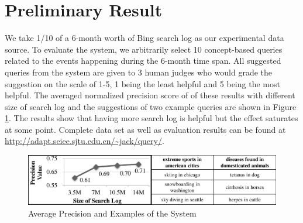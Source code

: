 \section{Preliminary Result}\label{sec:result}
We take 1/10 of a 6-month worth of Bing search log as our experimental
data source. To evaluate the system, we arbitrarily select 10
concept-based queries related to the events happening during the 6-month
time span.
All suggested queries from the system are given to 3 human judges
who would grade the suggestion on the scale of 1-5, 1 being the least helpful
and 5 being the most helpful. The averaged normalized precision score of
of these results with different size of search log and the suggestions of two example queries are shown in
Figure \ref{fig:precision}. The results show that having more search log
is helpful but the effect saturates at some point. Complete data set
as well as evaluation results can be found at 
\url{http://adapt.seiee.sjtu.edu.cn/~jack/query/}.

\begin{figure}[th]
  \centering
  \includegraphics[width=0.9\columnwidth]{images/precision}
  \caption{Average Precision and Examples of the System} \label{fig:precision}
\end{figure}



